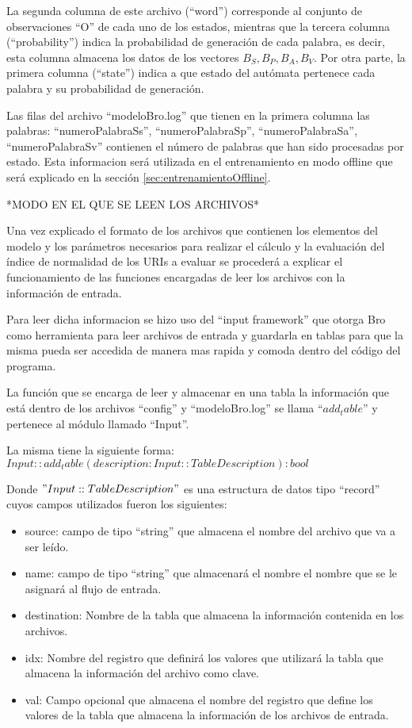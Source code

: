 La segunda columna de este archivo (“word”) corresponde al conjunto de observaciones “O” de cada uno de los estados, mientras que la tercera columna (“probability”) indica la probabilidad de generación de cada palabra, es decir, esta columna almacena los datos de los vectores $B_{S}, B_{P}, B_{A}, B_{V}$. Por otra parte, la primera columna (“state”) indica a que estado del autómata pertenece cada palabra y su probabilidad de generación.

Las filas del archivo “modeloBro.log” que tienen en la primera columna las palabras:       “numeroPalabraSs”, “numeroPalabraSp”, “numeroPalabraSa”, “numeroPalabraSv” contienen el número de palabras que han sido procesadas por estado. Esta informacion será utilizada en el entrenamiento en modo offline que será explicado en la sección \ref{sec:entrenamientoOffline}.

*MODO EN EL QUE SE LEEN LOS ARCHIVOS*

Una vez explicado el formato de los archivos que contienen los elementos del modelo y los parámetros necesarios para realizar el cálculo y la evaluación del índice de normalidad de los URIs a evaluar se procederá a explicar el funcionamiento de las funciones encargadas de leer los archivos con la información de entrada.

Para leer dicha informacion se hizo uso del  “input framework” que otorga Bro como herramienta para leer archivos de entrada y guardarla en tablas para que la misma pueda ser accedida de manera mas rapida y comoda dentro del código del programa. 

La función que se encarga de leer y almacenar en una tabla la información que está dentro de los archivos “config” y “modeloBro.log”  se llama $“add_table”$ y pertenece al módulo llamado “Input”.


%
La misma tiene la siguiente forma: $Input::add_table(description: Input::TableDescription) : bool$ 

Donde $"Input::TableDescription"$ es una estructura de datos tipo “record” cuyos campos utilizados fueron los siguientes:

\begin{itemize}
\item source: campo de tipo “string” que almacena el nombre del archivo que va a ser leído.
\item name: campo de tipo “string” que almacenará el nombre el nombre que se le asignará al flujo de entrada.
\item destination: Nombre de la tabla que almacena la información contenida en los archivos.
\item idx: Nombre del registro que definirá los valores que utilizará la tabla que almacena la información del archivo como clave.
\item val: Campo opcional que almacena el nombre del registro que define los valores de la tabla que almacena la información de los archivos de entrada.
\end{itemize}

